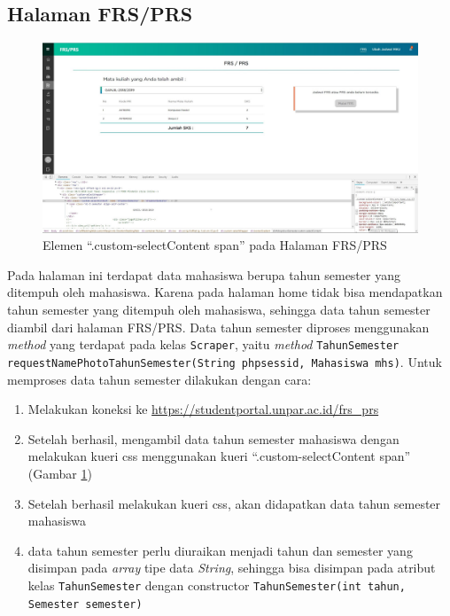 \subsection{Halaman FRS/PRS}
		\begin{figure}[H]
			\centering
			\includegraphics[scale=0.3]{Gambar/Home_semester_user}
			\caption{Elemen ``.custom-selectContent span'' pada Halaman FRS/PRS}
			\label{pic:home_semester_user}
		\end{figure}
Pada halaman ini terdapat data mahasiswa berupa tahun semester yang ditempuh oleh mahasiswa. Karena pada halaman home tidak bisa mendapatkan tahun semester yang ditempuh oleh mahasiswa, sehingga data tahun semester diambil dari halaman FRS/PRS. Data tahun semester diproses menggunakan \textit{method} yang terdapat pada kelas \texttt{Scraper}, yaitu  \textit{method} \texttt{TahunSemester requestNamePhotoTahunSemester(String phpsessid, Mahasiswa mhs)}. Untuk memproses data tahun semester dilakukan dengan cara:
\begin{enumerate}
	\item Melakukan koneksi ke \url{https://studentportal.unpar.ac.id/frs_prs}
	\item Setelah berhasil, mengambil data tahun semester mahasiswa dengan melakukan kueri css menggunakan kueri ``.custom-selectContent span'' (Gambar \ref{pic:home_semester_user})
	\item Setelah berhasil melakukan kueri css, akan didapatkan data tahun semester mahasiswa
	\item data tahun semester perlu diuraikan menjadi tahun dan semester yang disimpan pada \textit{array} tipe data \textit{String}, sehingga bisa disimpan pada atribut kelas \texttt{TahunSemester} dengan constructor \texttt{TahunSemester(int tahun, Semester semester)}
\end{enumerate}


